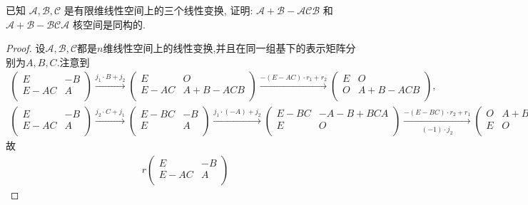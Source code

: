 \documentclass[../../main.tex]{subfiles}
\begin{document}
\begin{example}
已知 $\mathscr{A},\mathscr{B},\mathscr{C}$ 是有限维线性空间上的三个线性变换, 证明: $\mathscr{A} + \mathscr{B} - \mathscr{A}\mathscr{C}\mathscr{B}$ 和 $\mathscr{A} + \mathscr{B} - \mathscr{B}\mathscr{C}\mathscr{A}$ 核空间是同构的.
\end{example}
\begin{proof}
设$\mathscr{A} ,\mathscr{B} ,\mathscr{C} $都是$n$维线性空间上的线性变换,并且在同一组基下的表示矩阵分别为$A,B,C$.注意到
\begin{align*}
\begin{pmatrix}
E&		-B\\
E-AC&		A\\
\end{pmatrix} \xrightarrow{j_1\cdot B+j_2}\begin{pmatrix}
E&		O\\
E-AC&		A+B-ACB\\
\end{pmatrix} \xrightarrow{-( E-AC ) \cdot r_1+r_2}\begin{pmatrix}
E&		O\\
O&		A+B-ACB\\
\end{pmatrix},
\end{align*}
\begin{align*}
\begin{pmatrix}
E&		-B\\
E-AC&		A\\
\end{pmatrix} \xrightarrow{j_2\cdot C+j_1}\begin{pmatrix}
E-BC&		-B\\
E&		A\\
\end{pmatrix} \xrightarrow{j_1\cdot ( -A ) +j_2}\begin{pmatrix}
E-BC&		-A-B+BCA\\
E&		O\\
\end{pmatrix} \xrightarrow[(-1) \cdot j_2]{-( E-BC ) \cdot r_2+r_1}\begin{pmatrix}
O&		A+B-BCA\\
E&		O\\
\end{pmatrix}.
\end{align*}
故
\begin{align*}
r\begin{pmatrix}
E&		-B\\
E-AC&		A\\

\end{pmatrix}
\end{align*}
\end{proof}
\end{document}
